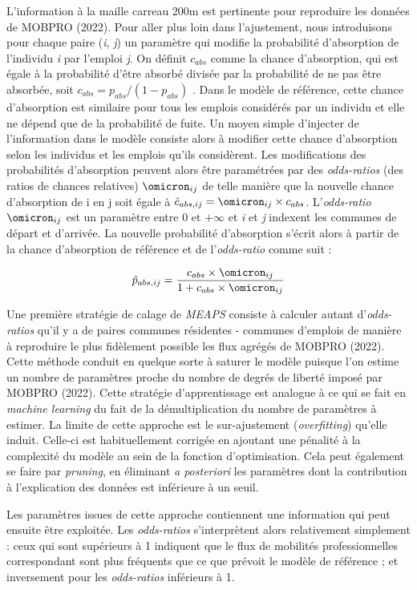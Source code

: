 \documentclass[
  10pt,
  a4paper,
  numbers=noendperiod,
  DIV=9]{scrartcl}
\begin{document}
L'information à la maille carreau 200m est pertinente pour reproduire
les données de MOBPRO (2022). Pour aller plus loin dans l'ajustement,
nous introduisons pour chaque paire (\emph{i}, \emph{j}) un paramètre
qui modifie la probabilité d'absorption de l'individu \emph{i} par
l'emploi \emph{j}. On définit \(c_{abs}\) comme la chance d'absorption,
qui est égale à la probabilité d'être absorbé divisée par la probabilité
de ne pas être absorbée, soit \(c_{abs} = p_{abs}/(1-p_{abs})\) . Dans
le modèle de référence, cette chance d'absorption est similaire pour
tous les emplois considérés par un individu et elle ne dépend que de la
probabilité de fuite. Un moyen simple d'injecter de l'information dans
le modèle consiste alors à modifier cette chance d'absorption selon les
individus et les emplois qu'ils considèrent. Les modifications des
probabilités d'absorption peuvent alors être paramétrées par des
\emph{odds-ratios} (des ratios de chances relatives) \(\omicron_{ij}\)
de telle manière que la nouvelle chance d'absorption de i en j soit
égale à \(\tilde{c}_{abs,ij} = \omicron_{ij} \times c_{abs}\).
L'\emph{odds-ratio} \(\omicron_{ij}\) est un paramètre entre \(0\) et
\(+\infty\) et \emph{i} et \emph{j} indexent les communes de départ et
d'arrivée. La nouvelle probabilité d'absorption s'écrit alors à partir
de la chance d'absorption de référence et de l'\emph{odds-ratio} comme
suit :

\[
\tilde{p}_{abs,ij} = \frac{c_{abs} \times \omicron_{ij}} {1+c_{abs} \times \omicron_{ij}} 
\]

Une première stratégie de calage de \emph{MEAPS} consiste à calculer
autant d'\emph{odds-ratios} qu'il y a de paires communes résidentes -
communes d'emplois de manière à reproduire le plus fidèlement possible
les flux agrégés de MOBPRO (2022). Cette méthode conduit en quelque
sorte à saturer le modèle puisque l'on estime un nombre de paramètres
proche du nombre de degrés de liberté imposé par MOBPRO (2022). Cette
stratégie d'apprentissage est analogue à ce qui se fait en \emph{machine
learning} du fait de la démultiplication du nombre de paramètres à
estimer. La limite de cette approche est le sur-ajustement
(\emph{overfitting}) qu'elle induit. Celle-ci est habituellement
corrigée en ajoutant une pénalité à la complexité du modèle au sein de
la fonction d'optimisation. Cela peut également se faire par
\emph{pruning}, en éliminant \emph{a posteriori} les paramètres dont la
contribution à l'explication des données est inférieure à un seuil.

Les paramètres issues de cette approche contiennent une information qui
peut ensuite être exploitée. Les \emph{odds-ratios} s'interprètent alors
relativement simplement : ceux qui sont supérieurs à 1 indiquent que le
flux de mobilités professionnelles correspondant sont plus fréquents que
ce que prévoit le modèle de référence ; et inversement pour les
\emph{odds-ratios} inférieurs à 1.
\end{document}
